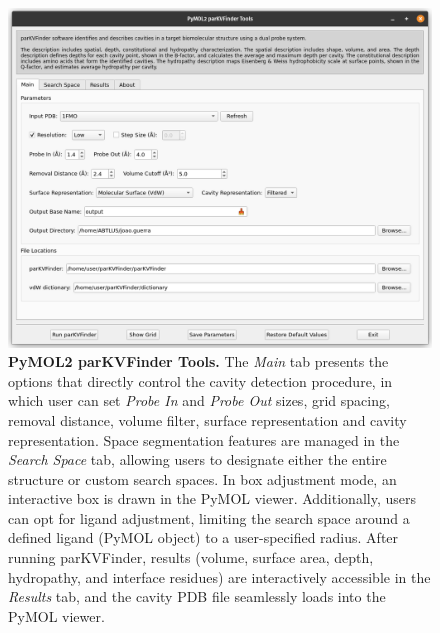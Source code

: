 \documentclass[Ingles]{phdthesis}
\begin{document}
\begin{figure}
  \centering
  \includegraphics[scale=0.35]{images/pymol2-parkvfinder-tools.png}
  \caption[PyMOL2 parKVFinder Tools]{\textbf{PyMOL2 parKVFinder Tools.} The \textit{Main} tab presents the options that directly control the cavity detection procedure, in which user can set \textit{Probe In} and \textit{Probe Out} sizes, grid spacing, removal distance, volume filter, surface representation and cavity representation. Space segmentation features are managed in the \textit{Search Space} tab, allowing users to designate either the entire structure or custom search spaces. In box adjustment mode, an interactive box is drawn in the PyMOL viewer. Additionally, users can opt for ligand adjustment, limiting the search space around a defined ligand (PyMOL object) to a user-specified radius. After running parKVFinder, results (volume, surface area, depth, hydropathy, and interface residues) are interactively accessible in the \textit{Results} tab, and the cavity PDB file seamlessly loads into the PyMOL viewer.}
  \label{fig:pymol2-parkvfinder-tools}
\end{figure}
\end{document}
